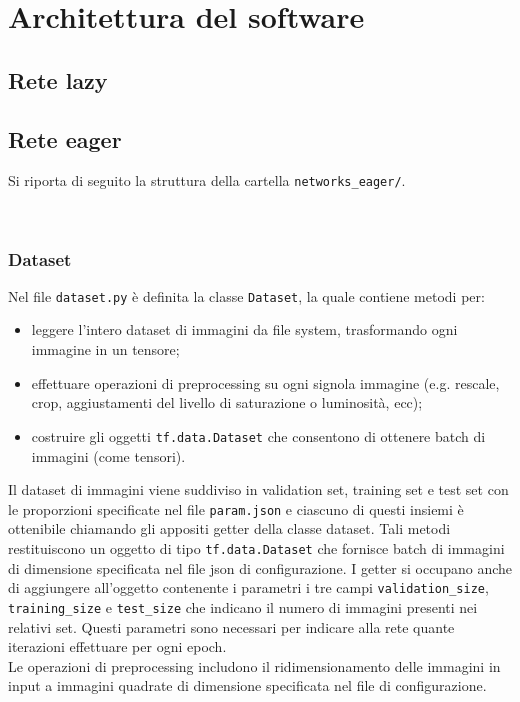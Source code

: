 
\chapter{Architettura del software}

\section{Rete lazy}

\section{Rete eager}

Si riporta di seguito la struttura della cartella \texttt{networks\_eager/}.

\begin{folder}
	\mbox{}\\
\end{folder}

\subsection{Dataset}

Nel file \texttt{dataset.py} è definita la classe \texttt{Dataset}, la quale contiene metodi per: 
\begin{itemize}
	\item leggere l'intero dataset di immagini da file system, trasformando ogni immagine in un tensore;
	\item effettuare operazioni di preprocessing su ogni signola immagine (e.g. rescale, crop, aggiustamenti del livello di saturazione o luminosità, ecc);
	\item costruire gli oggetti \texttt{tf.data.Dataset} che consentono di ottenere batch di immagini (come tensori).
\end{itemize}
Il dataset di immagini viene suddiviso in validation set, training set e test set con le proporzioni specificate nel file \texttt{param.json} e ciascuno di questi insiemi è ottenibile chiamando gli appositi getter della classe dataset. Tali metodi restituiscono un oggetto di tipo \texttt{tf.data.Dataset} che fornisce batch di immagini di dimensione specificata nel file json di configurazione. I getter si occupano anche di aggiungere all'oggetto contenente i parametri i tre campi \texttt{validation\_size}, \texttt{training\_size} e \texttt{test\_size} che indicano il numero di immagini presenti nei relativi set. Questi parametri sono necessari per indicare alla rete quante iterazioni effettuare per ogni epoch.\\
Le operazioni di preprocessing includono il ridimensionamento delle immagini in input a immagini quadrate di dimensione specificata nel file di configurazione.\\

